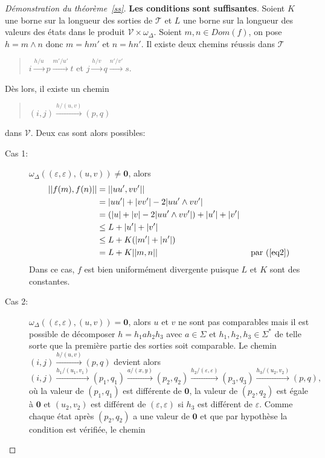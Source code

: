     \begin{proof}[Démonstration du théorème~\ref{ss}]
	    \textbf{Les conditions sont suffisantes}. Soient $K$ une borne sur la longueur des sorties de $\mathscr{T}$ et $L$ une borne sur la longueur des valeurs des états dans le produit $\mathscr{V} \times \omega_\Delta$.
	    Soient $m,n \in Dom(f)$, on pose $h = m \wedge n$ donc $m = hm'$ et $n = hn'$. Il existe deux chemins réussis dans $\mathscr{T}$
	    \begin{quotation}
	    	$i \xrightarrow{h/u} p \xrightarrow{m'/u'} t$ et $j \xrightarrow{h/v} q \xrightarrow{n'/v'} s$.
	    \end{quotation}
	    Dès lors, il existe un chemin
	    \begin{quotation}
	    	$(i,j) \xrightarrow{h/(u,v)} (p,q)$
	    \end{quotation}
	    dans $\mathscr{V}$. Deux cas sont alors possibles:
	    \begin{description}
	    	\item[Cas 1:] $\omega_\Delta((\varepsilon,\varepsilon),(u,v)) \neq \mathbf{0}$, alors
	    	\begin{align*}
		    	||f(m),f(n)|| &= ||uu',vv'|| \\
						      &= |uu'| + |vv'| - 2|uu' \wedge vv'| \\
						      &= (|u| + |v| - 2|uu' \wedge vv'|) + |u'| + |v'| \\
						      &\leq L + |u'| + |v'| \\
						      &\leq L + K(|m'|+|n'|) \\
						      &= L+K||m,n|| & \text{ par~(\ref{eq2})}
	    	\end{align*}
	    	Dans ce cas, $f$ est bien uniformément divergente puisque $L$ et $K$ sont des constantes.
	    	\item[Cas 2:] $\omega_\Delta((\varepsilon,\varepsilon),(u,v)) = \mathbf{0}$, alors $u$ et $v$ ne sont pas comparables mais il est possible de décomposer $h=h_1ah_2h_3$ avec $a \in \Sigma$ et $h_1,h_2,h_3 \in \Sigma^*$ de telle sorte que la première partie des sorties soit comparable. Le chemin $(i,j) \xrightarrow{h/(u,v)} (p,q)$ devient alors
	    	\begin{equation*}
	    		(i,j) \xrightarrow{h_1/(u_1,v_1)} (p_1,q_1) \xrightarrow{a/(x,y)} (p_2,q_2) \xrightarrow{h_2/(\varepsilon,\varepsilon)} (p_3,q_3) \xrightarrow{h_3/(u_2,v_2)} (p,q),
	    	\end{equation*}
	    	où la valeur de $(p_1,q_1)$ est différente de $\mathbf{0}$, la valeur de $(p_2,q_2)$ est égale à $\mathbf{0}$ et $(u_2,v_2)$ est différent de $(\varepsilon,\varepsilon)$ si $h_3$ est différent de $\varepsilon$. Comme chaque état après $(p_2,q_2)$ a une valeur de $\mathbf{0}$ et que par hypothèse la condition est vérifiée, le chemin

\end{description}
\end{proof}
